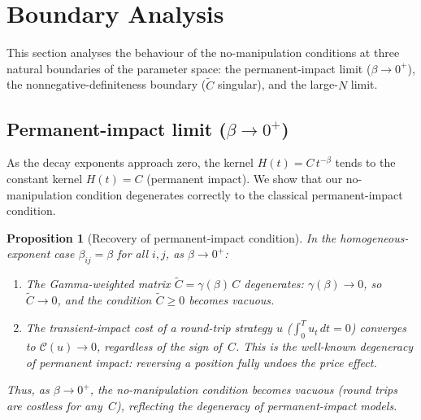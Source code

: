 \documentclass[12pt]{article}
\newtheorem{proposition}[theorem]{Proposition}
\theoremstyle{definition}
\theoremstyle{remark}
\newcommand{\bC}{\widetilde{C}}
\begin{document}
\section{Boundary Analysis}\label{sec:boundary}

This section analyses the behaviour of the no-manipulation conditions at three
natural boundaries of the parameter space: the permanent-impact limit
($\beta\to 0^+$), the nonnegative-definiteness boundary ($\bC$ singular),
and the large-$N$ limit.

\subsection{Permanent-impact limit (\texorpdfstring{$\beta\to 0^+$}{beta to 0+})}
\label{sec:permanent}

As the decay exponents approach zero, the kernel $H(t) = C\,t^{-\beta}$ tends to
the constant kernel $H(t) = C$ (permanent impact).  We show that our no-manipulation
condition degenerates correctly to the classical permanent-impact condition.

\begin{proposition}[Recovery of permanent-impact condition]\label{prop:permanent}
In the homogeneous-exponent case $\beta_{ij}=\beta$ for all $i,j$, as $\beta\to 0^+$:
\begin{enumerate}[label=\textup{(\roman*)},nosep]
\item The Gamma-weighted matrix $\bC = \gamma(\beta)\,C$ degenerates:
  $\gamma(\beta)\to 0$, so $\bC\to 0$, and the condition $\bC\ge 0$ becomes vacuous.
\item The transient-impact cost of a round-trip strategy $u$
  ($\int_0^T u_t\,dt = 0$) converges to
  $\mathcal{C}(u) \to 0$,
  regardless of the sign of~$C$. This is the well-known degeneracy of
  permanent impact: reversing a position fully undoes the price effect.
\end{enumerate}
Thus, as $\beta\to 0^+$, the no-manipulation condition becomes vacuous
(round trips are costless for any~$C$), reflecting the degeneracy of
permanent-impact models.
\end{proposition}
\end{document}
